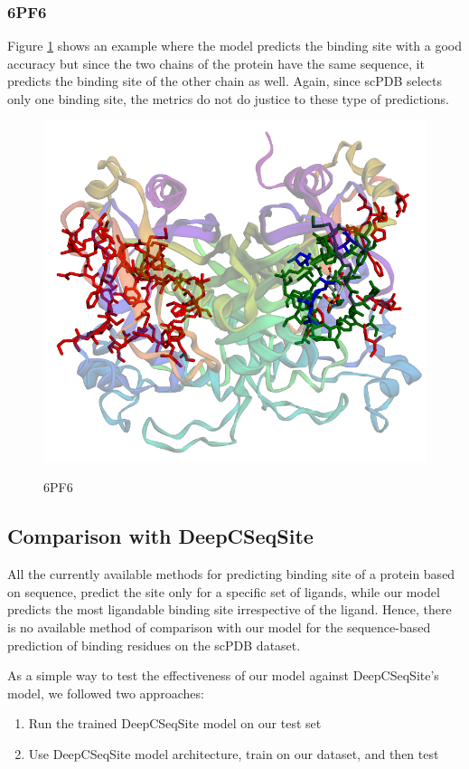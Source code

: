 \documentclass[journal=jacsat,manuscript=article]{achemso}
\begin{document}
\subsubsection{6PF6}
\quad Figure \ref{fig:6pf6} shows an example where the model predicts the binding site with a good accuracy but since the two chains of the protein have the same sequence, it predicts the binding site of the other chain as well. Again, since scPDB selects only one binding site, the metrics do not do justice to these type of predictions.
\begin{figure}
    \caption{\centering 6PF6}
    \centering
    \noindent\includegraphics[scale=0.4]{6pf6.png}
    \label{fig:6pf6}
\end{figure}

\subsection{Comparison with DeepCSeqSite}
All the currently available methods for predicting binding site of a protein based on sequence, predict the site only for a specific set of ligands, while our model predicts the most ligandable binding site irrespective of the ligand. Hence, there is no available method of comparison with our model for the sequence-based prediction of binding residues on the scPDB dataset.

\newpage
As a simple way to test the effectiveness of our model against DeepCSeqSite's model, we followed two approaches:
\begin{enumerate}
    \item Run the trained DeepCSeqSite model on our test set
    \item Use DeepCSeqSite model architecture, train on our dataset, and then test
\end{enumerate}
\end{document}
